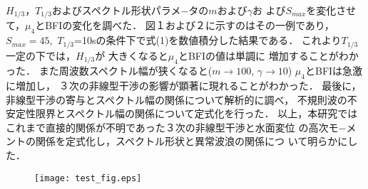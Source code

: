 \documentclass[a4,11pt]{jarticle}
\begin{document}
$H_{1/3}$，$T_{1/3}$およびスペクトル形状パラメ−タの$m$および$\gamma$お
よび$S_{max}$を変化させて，$\mu_4$とBFIの変化を調べた．
図１および２に示すのはその一例であり，$S_{max}=45$,\ $T_{1/3}$=10sの条件下で式(1)を数値積分した結果である．
これより$T_{1/3}$一定の下では，$H_{1/3}$が
大きくなると$\mu_4$とBFIの値は単調に
増加することがわかった．
また周波数スペクトル幅が狭くなると($m\rightarrow100$, $\gamma\rightarrow10$)
$\mu_4$とBFIは急激に増加し，
３次の非線型干渉の影響が顕著に現れることがわかった．
最後に，非線型干渉の寄与とスペクトル幅の関係について解析的に調べ，
不規則波の不安定性限界とスペクトル幅の関係について定式化を行った．
以上，本研究では
これまで直接的関係が不明であった３次の非線型干渉と水面変位
の高次モ−メントの関係を定式化し，スペクトル形状と異常波浪の関係につ
いて明らかにした．

\begin{figure}
\texttt{[image: test\_fig.eps]}
\end{figure}
\end{document}

